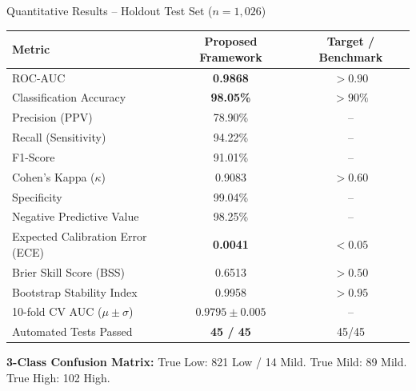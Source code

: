 \documentclass[aspectratio=169]{beamer}
\begin{document}
\begin{frame}{Quantitative Results -- Holdout Test Set ($n=1{,}026$)}
  \begin{center}\small
  \begin{tabular}{@{}lcc@{}}
    \toprule
    \textbf{Metric} & \textbf{Proposed Framework} & \textbf{Target / Benchmark} \\
    \midrule
    ROC-AUC                          & \textbf{0.9868} & $>0.90$ \\
    Classification Accuracy          & \textbf{98.05\%} & $>90\%$ \\
    Precision (PPV)                  & 78.90\%  & -- \\
    Recall (Sensitivity)             & 94.22\%  & -- \\
    F1-Score                         & 91.01\%  & -- \\
    Cohen's Kappa ($\kappa$)         & 0.9083   & $>0.60$ \\
    Specificity                      & 99.04\%  & -- \\
    Negative Predictive Value        & 98.25\%  & -- \\
    Expected Calibration Error (ECE) & \textbf{0.0041} & $<0.05$ \\
    Brier Skill Score (BSS)          & 0.6513   & $>0.50$ \\
    Bootstrap Stability Index        & 0.9958   & $>0.95$ \\
    10-fold CV AUC ($\mu\pm\sigma$)  & $0.9795\pm0.005$ & -- \\
    Automated Tests Passed           & \textbf{45 / 45} & 45/45 \\
    \bottomrule
  \end{tabular}
  \end{center}
  {\color{teal!80!black}\small\textbf{3-Class Confusion Matrix:}
  True Low: 821 Low / 14 Mild. \quad True Mild: 89 Mild. \quad True High: 102 High.}
\end{frame}

\end{document}
